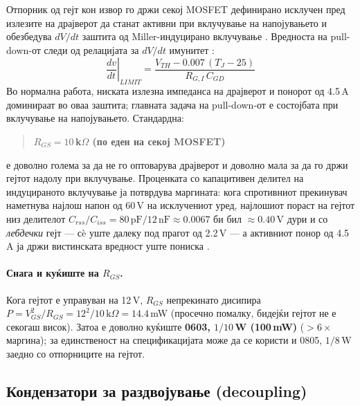 \documentclass[11pt,a4paper]{article}
\newcommand{\eng}[1]{\textenglish{#1}}
\begin{document}
Отпорник од гејт кон извор го држи секој MOSFET дефинирано исклучен пред излезите на драјверот да станат активни при вклучување на напојувањето и обезбедува $dV/dt$ заштита од \eng{Miller}-индуцирано вклучување \cite{ref5}. Вредноста на \eng{pull-down}-от следи од релацијата за $dV/dt$ имунитет \cite{ref5}:
\begin{equation}
\left.\frac{dv}{dt}\right|_{LIMIT} = \frac{V_{TH} - 0.007\,(T_J - 25)}{R_{G,I}\,C_{GD}}
\end{equation}
Во нормална работа, ниската излезна импеданса на драјверот и понорот од 4.5\,A доминираат во оваа заштита; главната задача на \eng{pull-down}-от е состојбата при вклучување на напојувањето. Стандардна:
\begin{quote}
\textbf{$R_{GS} = 10\,$k$\Omega$ (по еден на секој MOSFET)}
\end{quote}
е доволно голема за да не го оптоварува драјверот и доволно мала за да го држи гејтот надолу при вклучување. Проценката со капацитивен делител на индуцираното вклучување ја потврдува маргината: кога спротивниот прекинувач наметнува најлош напон од 60\,V на исклучениот уред, најлошиот пораст на гејтот низ делителот $C_{rss}/C_{iss}=80\,\mathrm{pF}/12\,\mathrm{nF}\approx 0.0067$ би бил $\approx 0.40$\,V дури и со \emph{лебдечки} гејт --- сè уште далеку под прагот од 2.2\,V \cite{ref1} --- а активниот понор од 4.5\,A ја држи вистинската вредност уште пониска \cite{ref3}.

\paragraph{Снага и куќиште на $R_{GS}$.} Кога гејтот е управуван на 12\,V, $R_{GS}$ непрекинато дисипира $P = V_{GS}^2/R_{GS} = 12^2/10\,\mathrm{k}\Omega = 14.4$\,mW (просечно помалку, бидејќи гејтот не е секогаш висок). Затоа е доволно куќиште \textbf{0603, $1/10$\,W (100\,mW)} ($>6\times$ маргина); за единственост на спецификацијата може да се користи и 0805, $1/8$\,W заедно со отпорниците на гејтот.

\subsection{Кондензатори за раздвојување (decoupling)}
\end{document}
